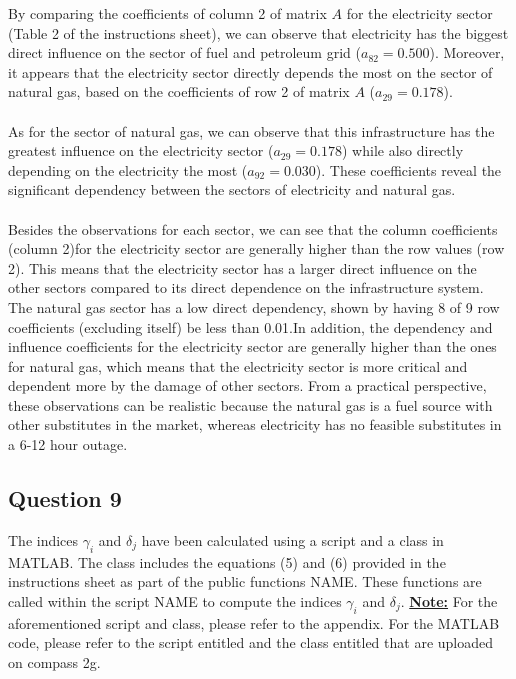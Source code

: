 \documentclass[11pt,a4paper]{article}
\begin{document}
By comparing the coefficients of column 2 of matrix $A$ for the electricity sector (Table 2 of the instructions sheet), we can observe that electricity has the biggest direct influence on the sector of fuel and petroleum grid ($a_{82} = 0.500$). Moreover, it appears that the electricity sector directly depends the most on the sector of natural gas, based on the coefficients of row 2 of matrix $A$ ($a_{29} = 0.178$).\\
\\
As for the sector of natural gas, we can observe that this infrastructure has the greatest influence on the electricity sector ($a_{29} = 0.178$) while also directly depending on the electricity the most ($a_{92} = 0.030$). These coefficients reveal the significant dependency between the sectors of electricity and natural gas.\\
\\
Besides the observations for each sector, we can see that the column coefficients (column 2)for the electricity sector are generally higher than the row values (row 2). This means that the electricity sector has a larger direct influence on the other sectors compared to its direct dependence on the infrastructure system. The natural gas sector has a low direct dependency, shown by having 8 of 9 row coefficients (excluding itself) be less than 0.01.In addition, the dependency and influence coefficients for the electricity sector are generally higher than the ones for natural gas, which means that the electricity sector is more critical and dependent more by the damage of other sectors. From a practical perspective, these observations can be realistic because the natural gas is a fuel source with other substitutes in the market, whereas electricity has no feasible substitutes in a 6-12 hour outage.

\subsection*{Question 9}

The indices $\gamma_i$ and $\delta_j$ have been calculated using a script and a class in MATLAB. The class includes the equations (5) and (6) provided in the instructions sheet as part of the public functions NAME. These functions are called within the script NAME to compute the indices $\gamma_i$ and $\delta_j$. 
\underline{\textbf{Note:}} For the aforementioned script and class, please refer to the appendix. For the MATLAB code, please refer to the script entitled  and the class entitled  that are uploaded on compass 2g.
\end{document}
